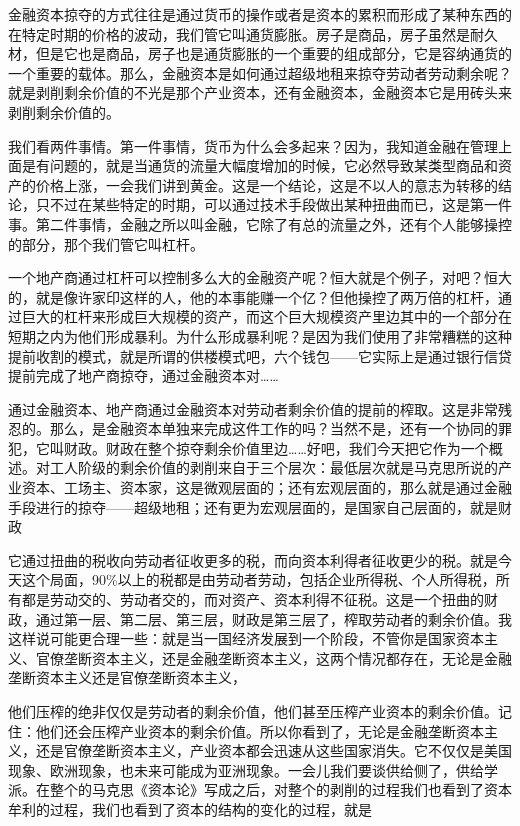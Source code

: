 \documentclass[UTF8, 12pt, a4paper]{ctexrep}
\begin{document}
金融资本掠夺的方式往往是通过货币的操作或者是资本的累积而形成了某种东西的在特定时期的价格的波动，我们管它叫通货膨胀。房子是商品，房子虽然是耐久材，但是它也是商品，房子也是通货膨胀的一个重要的组成部分，它是容纳通货的一个重要的载体。那么，金融资本是如何通过超级地租来掠夺劳动者劳动剩余呢？就是剥削剩余价值的不光是那个产业资本，还有金融资本，金融资本它是用砖头来剥削剩余价值的。

我们看两件事情。第一件事情，货币为什么会多起来？因为，我知道金融在管理上面是有问题的，就是当通货的流量大幅度增加的时候，它必然导致某类型商品和资产的价格上涨，一会我们讲到黄金。这是一个结论，这是不以人的意志为转移的结论，只不过在某些特定的时期，可以通过技术手段做出某种扭曲而已，这是第一件事。第二件事情，金融之所以叫金融，它除了有总的流量之外，还有个人能够操控的部分，那个我们管它叫杠杆。

一个地产商通过杠杆可以控制多么大的金融资产呢？恒大就是个例子，对吧？恒大的，就是像许家印这样的人，他的本事能赚一个亿？但他操控了两万倍的杠杆，通过巨大的杠杆来形成巨大规模的资产，而这个巨大规模资产里边其中的一个部分在短期之内为他们形成暴利。为什么形成暴利呢？是因为我们使用了非常糟糕的这种提前收割的模式，就是所谓的供楼模式吧，六个钱包——它实际上是通过银行信贷提前完成了地产商掠夺，通过金融资本对……

通过金融资本、地产商通过金融资本对劳动者剩余价值的提前的榨取。这是非常残忍的。那么，是金融资本单独来完成这件工作的吗？当然不是，还有一个协同的罪犯，它叫财政。财政在整个掠夺剩余价值里边……好吧，我们今天把它作为一个概述。对工人阶级的剩余价值的剥削来自于三个层次：最低层次就是马克思所说的产业资本、工场主、资本家，这是微观层面的；还有宏观层面的，那么就是通过金融手段进行的掠夺——超级地租；还有更为宏观层面的，是国家自己层面的，就是财政

它通过扭曲的税收向劳动者征收更多的税，而向资本利得者征收更少的税。就是今天这个局面，90\%以上的税都是由劳动者劳动，包括企业所得税、个人所得税，所有都是劳动交的、劳动者交的，而对资产、资本利得不征税。这是一个扭曲的财政，通过第一层、第二层、第三层，财政是第三层了，榨取劳动者的剩余价值。我这样说可能更合理一些：就是当一国经济发展到一个阶段，不管你是国家资本主义、官僚垄断资本主义，还是金融垄断资本主义，这两个情况都存在，无论是金融垄断资本主义还是官僚垄断资本主义，

他们压榨的绝非仅仅是劳动者的剩余价值，他们甚至压榨产业资本的剩余价值。记住：他们还会压榨产业资本的剩余价值。所以你看到了，无论是金融垄断资本主义，还是官僚垄断资本主义，产业资本都会迅速从这些国家消失。它不仅仅是美国现象、欧洲现象，也未来可能成为亚洲现象。一会儿我们要谈供给侧了，供给学派。在整个的马克思《资本论》写成之后，对整个的剥削的过程我们也看到了资本牟利的过程，我们也看到了资本的结构的变化的过程，就是
\end{document}

